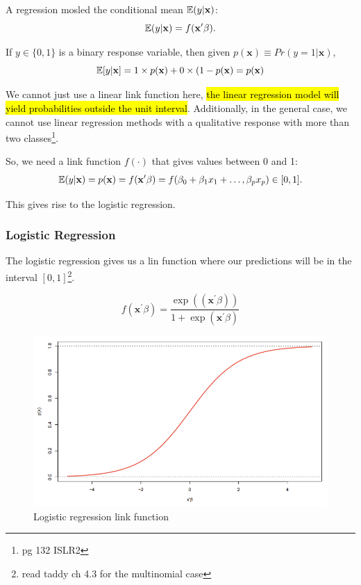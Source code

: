 \documentclass[11pt]{article}
\begin{document}
A regression mosled the conditional mean $\mathbb{E}(y|\mathbf{x})$:
\begin{equation*}
    \mathbb{E}(y|\mathbf{x}) = f(\mathbf{x^\prime}\beta).
\end{equation*}

If $y \in \{0,1\}$ is a binary response variable, then given $p(\mathbf{x}) \equiv Pr(y = 1|\mathbf{x})$,
\begin{equation*}
    \mathbb{E}[y|\mathbf{x}] = 1 \times p(\mathbf{x}) + 0 \times (1-p(\mathbf{x}) = p(\mathbf{x})
\end{equation*}

We cannot just use a linear link function here, \hl{the linear regression model will yield probabilities outside the unit interval}. Additionally, in the general case, we cannot use linear regression methods with a qualitative response with more than two classes\footnote{pg 132 ISLR2}.

So, we need a link function $f(\cdot)$ that gives values between 0 and 1:
\begin{equation*}
    \mathbb{E}(y|\mathbf{x}) = p(\mathbf{x}) = f(\mathbf{x^\prime}\beta) = f(\beta_0 + \beta_1 x_1 + \ldots, \beta_p x_p) \in [0,1].
\end{equation*}

This gives rise to the logistic regression.

\subsubsection{Logistic Regression}

The logistic regression gives us a lin function where our predictions will be in the interval $[0,1]$\footnote{read taddy ch 4.3 for the multinomial case}.

\begin{equation}
    \label{eq:logistic link}
    f(\mathbf{x^\prime}\beta) = \dfrac{\exp((\mathbf{x^\prime}\beta))}{1 + \exp (\mathbf{x^\prime}\beta)}
\end{equation}

\begin{figure}[h]
    \centering
    \includegraphics[width=.25\linewidth]{pic/logistic.png}
    \caption{Logistic regression link function}
    \label{fig:enter-label}
\end{figure}
\end{document}
